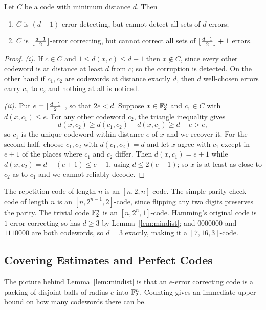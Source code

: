 \documentclass[a4paper]{scrartcl}
\DeclarePairedDelimiter{\floor}{\lfloor}{\rfloor}
\begin{document}
\begin{lemma}\label{lem:mindist}
	Let $C$ be a code with minimum distance $d$. Then
	\begin{enumerate}[label=(\roman*)]
		\item $C$ is $(d-1)$-error detecting, but cannot detect all sets of $d$ errors;
		\item $C$ is $\floor{\frac{d-1}{2}}$-error correcting, but cannot correct all sets of $\floor{\frac{d-1}{2}}+1$ errors.
	\end{enumerate}
\end{lemma}

\begin{proof}
	\emph{(i).} If $c \in C$ and $1 \le d(x,c) \le d-1$ then $x \notin C$, since every other codeword is at distance at least $d$ from $c$; so the corruption is detected. On the other hand if $c_1, c_2$ are codewords at distance exactly $d$, then $d$ well-chosen errors carry $c_1$ to $c_2$ and nothing at all is noticed.

	\emph{(ii).} Put $e = \floor{\frac{d-1}{2}}$, so that $2e < d$. Suppose $x \in \mathbb{F}_2^n$ and $c_1 \in C$ with $d(x,c_1) \le e$. For any other codeword $c_2$, the triangle inequality gives
	$$d(x,c_2) \ge d(c_1,c_2) - d(x,c_1) \ge d - e > e,$$
	so $c_1$ is the unique codeword within distance $e$ of $x$ and we recover it. For the second half, choose $c_1, c_2$ with $d(c_1,c_2) = d$ and let $x$ agree with $c_1$ except in $e+1$ of the places where $c_1$ and $c_2$ differ. Then $d(x,c_1) = e+1$ while $d(x,c_2) = d - (e+1) \le e+1$, using $d \le 2(e+1)$; so $x$ is at least as close to $c_2$ as to $c_1$ and we cannot reliably decode.
\end{proof}

\begin{example}
	The repetition code of length $n$ is an $[n,2,n]$-code. The simple parity check code of length $n$ is an $[n,2^{n-1},2]$-code, since flipping any two digits preserves the parity. The trivial code $\mathbb{F}_2^n$ is an $[n,2^n,1]$-code. Hamming's original code is $1$-error correcting so has $d \ge 3$ by Lemma~\ref{lem:mindist}; and $0000000$ and $1110000$ are both codewords, so $d = 3$ exactly, making it a $[7,16,3]$-code.
\end{example}

\subsection{Covering Estimates and Perfect Codes}

The picture behind Lemma~\ref{lem:mindist} is that an $e$-error correcting code is a packing of disjoint balls of radius $e$ into $\mathbb{F}_2^n$. Counting gives an immediate upper bound on how many codewords there can be.
\end{document}
